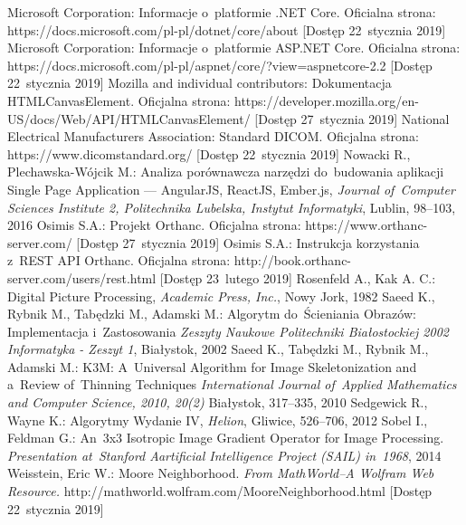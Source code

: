\documentclass[a4paper,11pt,twoside,openright]{report}
\theoremstyle{definition}
\begin{document}
\begin{thebibliography}{24}
 Microsoft Corporation: Informacje o~platformie .NET Core. Oficialna strona: https://docs.microsoft.com/pl-pl/dotnet/core/about [Dostęp 22~stycznia 2019]
 Microsoft Corporation: Informacje o~platformie ASP.NET Core. Oficialna strona: https://docs.microsoft.com/pl-pl/aspnet/core/?view=aspnetcore-2.2 [Dostęp 22~stycznia 2019]
 Mozilla and individual contributors: Dokumentacja HTMLCanvasElement. Oficjalna strona: https://developer.mozilla.org/en-US/docs/Web/API/HTMLCanvasElement/ [Dostęp 27~stycznia 2019]
 National Electrical Manufacturers Association: Standard DICOM. Oficjalna strona: https://www.dicomstandard.org/ [Dostęp 22~stycznia 2019]
 Nowacki R., Plechawska-Wójcik M.: Analiza porównawcza narzędzi do~budowania aplikacji Single Page Application --- AngularJS, ReactJS, Ember.js, \emph{Journal of~Computer Sciences Institute 2, Politechnika Lubelska, Instytut Informatyki}, Lublin, 98--103, 2016
 Osimis S.A.: Projekt Orthanc. Oficjalna strona: https://www.orthanc-server.com/ [Dostęp 27~stycznia 2019]
 Osimis S.A.: Instrukcja korzystania z~REST API Orthanc. Oficjalna strona: http://book.orthanc-server.com/users/rest.html [Dostęp 23~lutego 2019]
 Rosenfeld A., Kak A. C.: Digital Picture Processing, \emph{Academic Press, Inc.}, Nowy Jork, 1982
 Saeed K., Rybnik M., Tabędzki M., Adamski M.: Algorytm do~Ścieniania Obrazów: Implementacja i~Zastosowania \emph{Zeszyty Naukowe Politechniki Białostockiej 2002 Informatyka - Zeszyt 1}, Białystok, 2002
 Saeed K., Tabędzki M., Rybnik M., Adamski M.: K3M: A~Universal Algorithm for Image Skeletonization and a~Review of~Thinning Techniques \emph{International Journal of~Applied Mathematics and Computer Science, 2010, 20(2)} Białystok, 317--335, 2010
 Sedgewick R., Wayne K.: Algorytmy Wydanie IV, \emph{Helion}, Gliwice, 526--706, 2012
 Sobel I., Feldman G.: An~3x3 Isotropic Image Gradient Operator for Image Processing. \emph {Presentation at~Stanford Aartificial Intelligence Project (SAIL) in~1968}, 2014
  Weisstein, Eric W.: Moore Neighborhood. \emph{From MathWorld--A Wolfram Web Resource.} http://mathworld.wolfram.com/MooreNeighborhood.html  [Dostęp 22~stycznia 2019]

\end{thebibliography}
\end{document}
